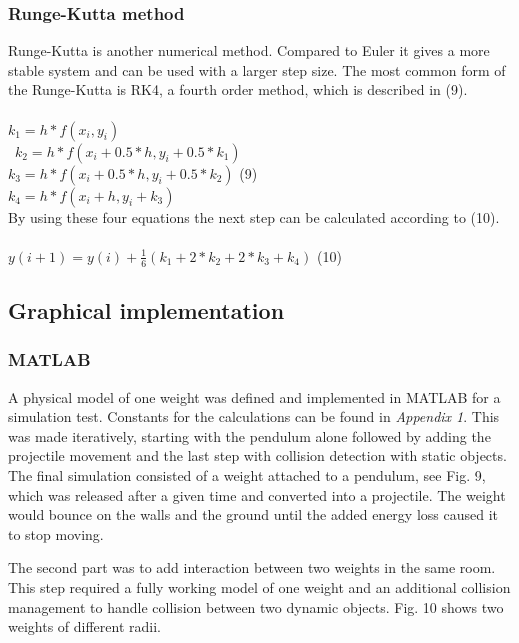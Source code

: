 \documentclass[a4paper,12pt,twoside,english]{article}
\begin{document}
\subsubsection{Runge-Kutta method}
Runge-Kutta is another numerical method. Compared to Euler it gives a more stable system and can be used with a larger step size. The most common form of the Runge-Kutta is RK4, a fourth order method, which is described in (9).\\ \\
$k_1 = h*f(x_i, y_i) $ \\ \
$k_2 = h*f(x_i + 0.5*h, y_i + 0.5*k_1) $ \\
$k_3 = h*f(x_i + 0.5*h, y_i + 0.5*k_2)$ \hfill (9) \\
$k_4 = h*f(x_i + h, y_i + k_3)$ \\

By using these four equations the next step can be calculated according to (10). \\ \\
$ y(i+1) = y(i) + \frac{1}{6}( k_1 + 2*k_2 + 2*k_3 + k_4) $ \hfill (10)

\subsection{Graphical implementation}
\subsubsection{MATLAB}
A physical model of one weight was defined and implemented in MATLAB for a simulation test. Constants for the calculations can be found in \textit{Appendix 1}. This was made iteratively, starting with the pendulum alone followed by adding the projectile movement and the last step with collision detection with static objects. The final simulation consisted of a weight attached to a pendulum, see Fig. 9, which was released after a given time and converted into a projectile. The weight would bounce on the walls and the ground until the added energy loss caused it to stop moving. 

The second part was to add interaction between two weights in the same room. This step required a fully working model of one weight and an additional collision management to handle collision between two dynamic objects. Fig. 10 shows two weights of different radii.
\end{document}
